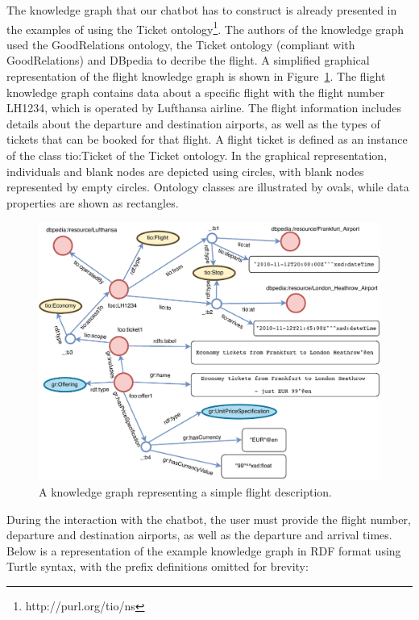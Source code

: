 \documentclass[runningheads]{llncs}
\begin{document}
The knowledge graph that our chatbot has to construct is already presented in the examples of using the Ticket ontology\footnote{\label{Ticket Ontology}http://purl.org/tio/ns}. The authors of the knowledge graph used the GoodRelations ontology\cite{hepp2008goodrelations}, the Ticket ontology (compliant with GoodRelations) and DBpedia to decribe the flight. A simplified graphical representation of the flight knowledge graph is shown in Figure~\ref{fig:usecase}.
The flight knowledge graph contains data about a specific flight with the flight number LH1234, which is operated by Lufthansa airline. The flight information includes details about the departure and destination airports, as well as the types of tickets that can be booked for that flight. A flight ticket is defined as an instance of the class tio:Ticket of the Ticket ontology. In the graphical representation, individuals and blank nodes are depicted using circles, with blank nodes represented by empty circles. Ontology classes are illustrated by ovals, while data properties are shown as rectangles. 
\begin{figure}[H]
  \centering
  \includegraphics[width=\linewidth]{img/use_case}
  \caption{A knowledge graph representing a simple flight description.}
  \label{fig:usecase}
\end{figure}
\FloatBarrier
During the interaction with the chatbot, the user must provide the flight number, departure and destination airports, as well as the departure and arrival times.
Below is a representation of the example knowledge graph in RDF format using Turtle syntax, with the prefix definitions omitted for brevity:
\end{document}
